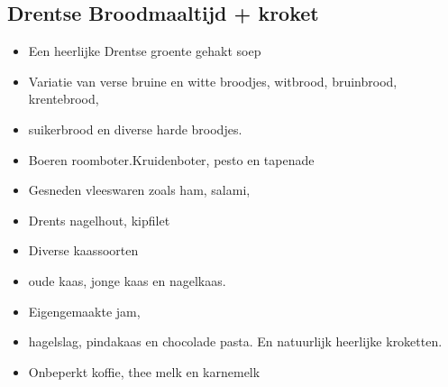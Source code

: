 
\subsection{Drentse Broodmaaltijd + kroket}

\begin{itemize} 
\item Een heerlijke Drentse groente gehakt soep
\item Variatie van verse bruine en witte broodjes, witbrood, bruinbrood, krentebrood, 
\item suikerbrood en diverse harde broodjes.
\item Boeren roomboter.Kruidenboter, pesto en tapenade
\item Gesneden vleeswaren zoals ham, salami,
\item  Drents nagelhout, kipfilet
\item Diverse kaassoorten 
\item oude kaas, jonge kaas en nagelkaas.
\item Eigengemaakte jam, 
\item hagelslag, pindakaas en chocolade pasta.  En natuurlijk heerlijke kroketten.
\item Onbeperkt koffie, thee melk en karnemelk

\end{itemize} 
